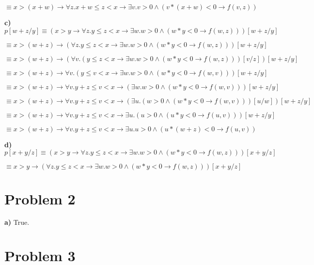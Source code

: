 \documentclass{article}
\begin{document}
\qquad \qquad \qquad  $ \equiv x>(x+w) \rightarrow \forall z.x+w \leq z < x \rightarrow \exists v.v>0 \wedge (v*(x+w)<0 \rightarrow f(v,z))$

\vspace{10pt}
\textbf{c)} $ p[w+z/y] \equiv (x>y \rightarrow \forall z.y \leq z < x \rightarrow \exists w.w>0 \wedge (w*y<0 \rightarrow f(w,z)))[w+z/y]$

\qquad \qquad \qquad  $ \equiv x>(w+z) \rightarrow (\forall z.y \leq z < x \rightarrow \exists w.w>0 \wedge (w*y<0 \rightarrow f(w,z)))[w+z/y]$

\qquad \qquad \qquad  $ \equiv x>(w+z) \rightarrow (\forall v.(y \leq z < x \rightarrow \exists w.w>0 \wedge (w*y<0 \rightarrow f(w,z)))[v/z])[w+z/y]$

\qquad \qquad \qquad  $ \equiv x>(w+z) \rightarrow \forall v.(y \leq v < x \rightarrow \exists w.w>0 \wedge (w*y<0 \rightarrow f(w,v)))[w+z/y]$

\qquad \qquad \qquad  $ \equiv x>(w+z) \rightarrow \forall v.y+z \leq v < x \rightarrow (\exists w.w>0 \wedge (w*y<0 \rightarrow f(w,v)))[w+z/y]$

\qquad \qquad \qquad  $ \equiv x>(w+z) \rightarrow \forall v.y+z \leq v < x \rightarrow (\exists u.(w>0 \wedge (w*y<0 \rightarrow f(w,v)))[u/w])[w+z/y]$

\qquad \qquad \qquad  $ \equiv x>(w+z) \rightarrow \forall v.y+z \leq v < x \rightarrow \exists u.(u>0 \wedge (u*y<0 \rightarrow f(u,v)))[w+z/y]$

\qquad \qquad \qquad  $ \equiv x>(w+z) \rightarrow \forall v.y+z \leq v < x \rightarrow \exists u.u>0 \wedge (u*(w+z)<0 \rightarrow f(u,v))$

\vspace{10pt}
\textbf{d)} $ p[x+y/z] \equiv (x>y \rightarrow \forall z.y \leq z < x \rightarrow \exists w.w>0 \wedge (w*y<0 \rightarrow f(w,z)))[x+y/z]$

\qquad \qquad \qquad  $ \equiv x>y \rightarrow (\forall z.y \leq z < x \rightarrow \exists w.w>0 \wedge (w*y<0 \rightarrow f(w,z)))[x+y/z]$


\section*{Problem 2}

\textbf{a)} True.


\section*{Problem 3}
\end{document}
